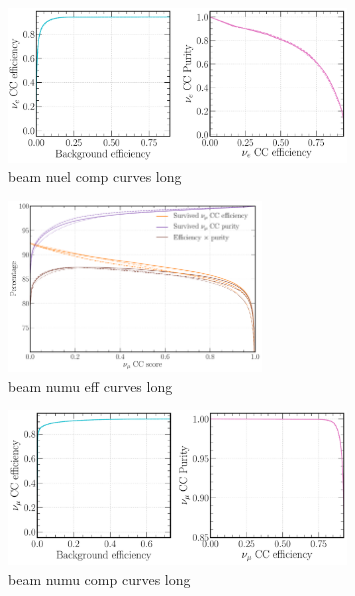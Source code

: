 \begin{figure} %
    \includegraphics[width=0.8\textwidth]{diagrams/7-cvn/chipsnet/beam_nuel_comp_curves.pdf}
    \caption[beam nuel comp curves short]
    {beam nuel comp curves long}
    \label{fig:beam_nuel_comp_curves}
\end{figure}

\begin{figure} %
    \includegraphics[width=0.6\textwidth]{diagrams/7-cvn/chipsnet/beam_numu_eff_curves.pdf}
    \caption[beam numu eff curves short]
    {beam numu eff curves long}
    \label{fig:beam_numu_eff_curves}
\end{figure}

\begin{figure} %
    \includegraphics[width=0.8\textwidth]{diagrams/7-cvn/chipsnet/beam_numu_comp_curves.pdf}
    \caption[beam numu comp curves short]
    {beam numu comp curves long}
    \label{fig:beam_numu_comp_curves}
\end{figure}

